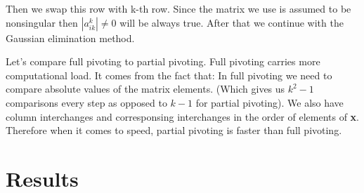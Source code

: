 \documentclass[12pt]{report}
\begin{document}
Then we swap this row with k-th row. Since the matrix we use is assumed to be nonsingular then $|{a_{ik}^{k}}| \neq 0$ will be always true. After that we continue with the Gaussian elimination method.

Let's compare full pivoting to partial pivoting.
Full pivoting carries more computational load. It comes from the fact that:
In full pivoting we need to compare absolute values of the matrix elements. (Which gives us $ k^2-1$ comparisons every step as opposed to $k-1$ for partial pivoting). We also have column interchanges and corresponsing interchanges in the order of elements of \textbf{x}.
Therefore when it comes to speed, partial pivoting is faster than full pivoting.

\newpage
\section{Results}
\end{document}
